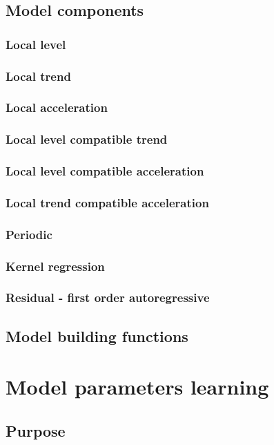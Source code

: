 \documentclass{article}
\begin{document}
\subsection{Model components}
\subsubsection{Local level}
\subsubsection{Local trend}
\subsubsection{Local acceleration}
\subsubsection{Local level compatible trend}
\subsubsection{Local level compatible acceleration}
\subsubsection{Local trend compatible acceleration}
\subsubsection{Periodic}
\subsubsection{Kernel regression}
\subsubsection{Residual - first order autoregressive}
\subsection{Model building functions}
\newpage

\section{Model parameters learning}
\subsection{Purpose}
\end{document}
